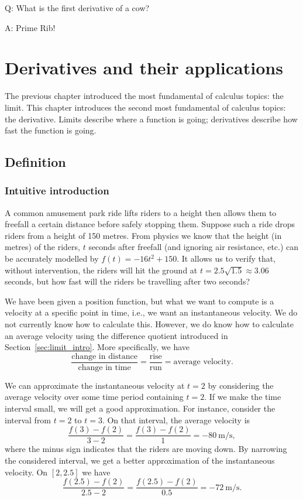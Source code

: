 \begin{savequote}[75mm]
Q: What is the first derivative of a cow? 

A: Prime Rib!
\end{savequote}


\chapter{Derivatives and their applications}
\label{chap_diff}
\graphicspath{{figures/Diff/}}

The previous chapter introduced the most fundamental of calculus topics: the limit. This chapter introduces the second most fundamental of calculus topics: the derivative. Limits describe where a function is going; derivatives describe how fast the function is going.


\section{Definition}
\label{sec:derivative}
\ifcourse
\subsection{Intuitive introduction}
A common amusement park ride lifts riders to a height then allows them to freefall a certain distance before safely stopping them. Suppose such a ride drops riders from a height of 150 metres. From physics we know that the height (in metres) of the riders, $t$ seconds after freefall (and ignoring air resistance, etc.) can be accurately modelled by $f(t) = -16t^2+150$. It allows us to verify that, without intervention, the riders will hit the ground at $t=2.5\sqrt{1.5} \approx 3.06$ seconds, but how fast will the riders be travelling after two seconds?

We have been given a position function, but what we want to compute is a velocity at a specific point in time, i.e., we want an instantaneous velocity. We do not currently know how to calculate this. However, we do know how to calculate an average velocity using the difference quotient introduced in  Section~\ref{sec:limit_intro}. More specifically, we have 
	$$
	\frac{\text{change in distance}}{\text{change in time}} = \frac{\text{rise}}{\text{run}} = \text{average velocity}.
	$$
	
We can approximate the instantaneous velocity at $t=2$ by considering the average velocity over some time period containing $t=2$. If we make the time interval small, we will get a good approximation. For instance, consider the interval from $t=2$ to $t=3$. On that interval, the average velocity is 
		$$
		\frac{f(3)-f(2)}{3-2} = \frac{f(3)-f(2)}{1} =-80\ \text{m/s},
		$$
where the minus sign indicates that the riders are moving down. By narrowing the considered interval, we get a better approximation of the instantaneous velocity. On $[2,2.5]$ we have 
	$$
	\frac{f(2.5)-f(2)}{2.5-2} = \frac{f(2.5)-f(2)}{0.5} =-72\ \text{m/s}.
	$$

